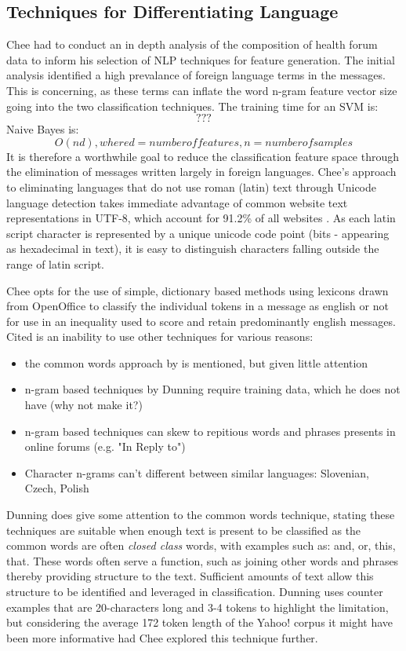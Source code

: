 \documentclass[twoside,11pt]{article}
\begin{document}
\subsection{Techniques for Differentiating Language}
Chee had to conduct an in depth analysis of the composition of health forum data to inform his selection of NLP techniques for feature generation. The initial analysis identified a high prevalance of foreign language terms in the messages. This is concerning, as these terms can inflate the word n-gram feature vector size going into the two classification techniques. The training time for an SVM is:
\[
???
\]
Naive Bayes is:
\[
  O(nd), where d = number of features, n = number of samples

\]
It is therefore a worthwhile goal to reduce the classification feature space through the elimination of messages written largely in foreign languages. Chee's approach to eliminating languages that do not use roman (latin) text through Unicode language detection takes immediate advantage of common website text representations in UTF-8, which account for 91.2\% of all websites \citep{UTF-8 article on wikipedia}. As each latin script character is represented by a unique unicode code point (bits - appearing as hexadecimal in text), it is easy to distinguish characters falling outside the range of latin script.

Chee opts for the use of simple, dictionary based methods using lexicons drawn from OpenOffice to classify the individual tokens in a message as english or not for use in an inequality used to score and retain predominantly english messages. Cited is an inability to use other techniques for various reasons:
\begin{itemize}
  \item the common words approach by \citep{Ingle, 1976} is mentioned, but given little attention
  \item n-gram based techniques by Dunning \citep{Dunning} require training data, which he does not have (why not make it?)
  \item n-gram based techniques can skew to repitious words and phrases presents in online forums (e.g. "In Reply to")
  \item Character n-grams can't different between similar languages: Slovenian, Czech, Polish
\end{itemize}

Dunning \citep{Dunning} does give some attention to the common words technique, stating these techniques are suitable when enough text is present to be classified as the common words are often \textit{closed class} words, with examples such as: and, or, this, that. These words often serve a function, such as joining other words and phrases thereby providing structure to the text. Sufficient amounts of text allow this structure to be identified and leveraged in classification. Dunning uses counter examples that are 20-characters long and 3-4 tokens to highlight the limitation, but considering the average 172 token length of the Yahoo! corpus it might have been more informative had Chee explored this technique further.
\end{document}

